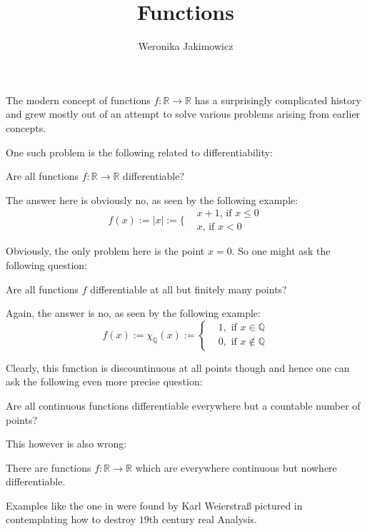 \documentclass{article}
\title{Functions}
\author{Weronika Jakimowicz}
\theoremstyle{qqStyle}
\newcommand{\R}{\mathbb{R}}
\newcommand{\Q}{\mathbb{Q}}
\begin{document}
\maketitle

The modern concept of functions $f:\R\to\R$ has a surprisingly complicated history and grew mostly out of an attempt to solve various problems arising from earlier concepts.

One such problem is the following related to differentiability:

\begin{qq}\label{q1}
Are all functions $f:\R\to\R$ differentiable?
\end{qq}

The answer here is obviously no, as seen by the following example:
$$
f(x):=|x|:=\Bigg\{\begin{array}{ll}&x+1\text{, if }x\leq 0\\&x\text{, if }x<0\end{array}
$$

Obviously, the only problem here is the point $x=0$. So one might ask the following question:
\begin{qq}\label{q2}
Are all functions $f$ differentiable at all but finitely many points?
\end{qq}

Again, the answer is no, as seen by the following example:
$$
f(x):=\chi_\Q(x):=\left\{\begin{array}{ll}&1,\text{ if }x\in\Q\\&0,\text{ if }x\notin\Q\end{array}\right.
$$

Clearly, this function is discountinuous at all points though and hence one can ask the following even more precise question:

\begin{qq2}\label{q3}
Are all continuous functions differentiable everywhere but a countable number of points?
\end{qq2}

This however is also wrong:

\begin{theorem}\label{thm4}
There are functions $f:\R\to\R$ which are everywhere continuous but nowhere differentiable.
\end{theorem}

Examples like the one in  were found by Karl Weierstraß pictured in  contemplating how to destroy $19$th century real Analysis.
\end{document}

